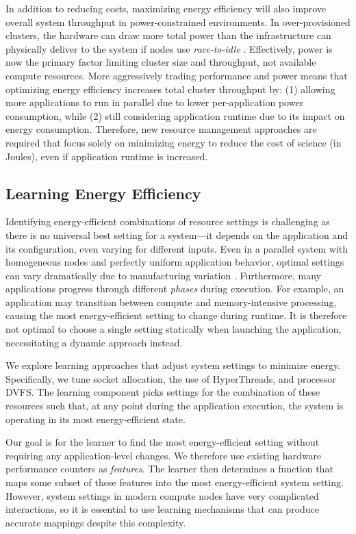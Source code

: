 In addition to reducing costs, maximizing energy efficiency will also improve overall system throughput in power-constrained environments.
In over-provisioned clusters, the hardware can draw more total power than the infrastructure can physically deliver to the system if nodes use \emph{race-to-idle} \cite{Sarood2013}.
Effectively, power is now the primary factor limiting cluster size and throughput, not available compute resources.
More aggressively trading performance and power means that optimizing energy efficiency increases total cluster throughput by: (1) allowing more applications to run in parallel due to lower per-application power consumption, while (2) still considering application runtime due to its impact on energy consumption.
Therefore, new resource management approaches are required that focus solely on minimizing energy to reduce the cost of science (in Joules), even if application runtime is increased.


\subsection{Learning Energy Efficiency}
\label{sec:challenges-learning}

Identifying energy-efficient combinations of resource settings is challenging as there is no universal best setting for a system---it depends on the application and its configuration, even varying for different inputs.
Even in a parallel system with homogeneous nodes and perfectly uniform application behavior, optimal settings can vary dramatically due to manufacturing variation \cite{Acun2016}.
Furthermore, many applications progress through different \emph{phases} during execution.
For example, an application may transition between compute and memory-intensive processing, causing the most energy-efficient setting to change during runtime.
It is therefore not optimal to choose a single setting statically when launching the application, necessitating a dynamic approach instead.

We explore learning approaches that adjust system settings to minimize energy.
Specifically, we tune socket allocation, the use of HyperThreads, and processor DVFS.
The learning component picks settings for the combination of these resources such that, at any point during the application execution, the system is operating in its most energy-efficient state.

Our goal is for the learner to find the most energy-efficient setting without requiring any application-level changes.
We therefore use existing hardware performance counters as \emph{features}.
The learner then determines a function that maps some subset of these features into the most energy-efficient system setting.
However, system settings in modern compute nodes have very complicated interactions, so it is essential to use learning mechanisms that can produce accurate mappings despite this complexity.

